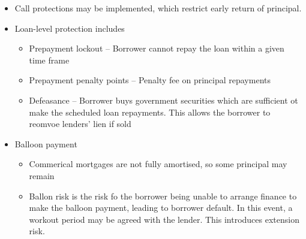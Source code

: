\documentclass[../notes_compiled.tex]{subfiles}
\begin{document}
\begin{itemize}
\item Call protections may be implemented, which restrict early return of principal.
\item Loan-level protection includes
\begin{itemize}
\item Prepayment lockout -- Borrower cannot repay the loan within a given time frame
\item Prepayment penalty points -- Penalty fee on principal repayments
\item Defeasance -- Borrower buys government securities which are sufficient ot make the scheduled loan repayments. This allows the borrower to reomvoe lenders’ lien if sold
\end{itemize}
\item Balloon payment
\begin{itemize}
\item Commerical mortgages are not fully amortised, so some principal may remain
\item Ballon risk is the risk fo the borrower being unable to arrange finance to make the balloon payment, leading to borrower default. In this event, a workout period may be agreed with the lender. This introduces extension risk.
\end{itemize}
\end{itemize}
\end{document}
